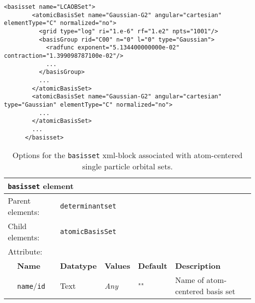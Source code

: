 \begin{minipage}{\linewidth}
\begin{lstlisting}[style=QMCPXML,caption=Basic input block for \ixml{basisset}.\label{listing:basisset}]
      <basisset name="LCAOBSet">
        <atomicBasisSet name="Gaussian-G2" angular="cartesian" elementType="C" normalized="no">
          <grid type="log" ri="1.e-6" rf="1.e2" npts="1001"/>
          <basisGroup rid="C00" n="0" l="0" type="Gaussian">
            <radfunc exponent="5.134400000000e-02" contraction="1.399098787100e-02"/>
            ...
          </basisGroup>
          ...              
        </atomicBasisSet>
        <atomicBasisSet name="Gaussian-G2" angular="cartesian" type="Gaussian" elementType="C" normalized="no">
          ...              
        </atomicBasisSet>
        ...
      </basisset>
\end{lstlisting}
\end{minipage}

\begin{table}[h]
\begin{center}
\begin{tabularx}{\textwidth}{l l l l l X }
\hline
\multicolumn{6}{l}{\texttt{basisset} element} \\
\hline
\multicolumn{2}{l}{Parent elements:} & \multicolumn{4}{l}{\texttt{determinantset}}\\
\multicolumn{2}{l}{Child  elements:} & \multicolumn{4}{l}{\texttt{atomicBasisSet}}\\
\multicolumn{2}{l}{Attribute:} & \multicolumn{4}{l}{}\\
   &   \bfseries Name              & \bfseries Datatype & \bfseries Values & \bfseries Default   & \bfseries Description \\
   &   \texttt{name}/\texttt{id}   &  Text              &  \textit{Any}    &  ""                & Name of atom-centered basis set \\
  \hline
\end{tabularx}
\end{center}
\caption{Options for the \texttt{basisset} xml-block associated with atom-centered single particle orbital sets.}
\label{table:basisset}
\end{table}

